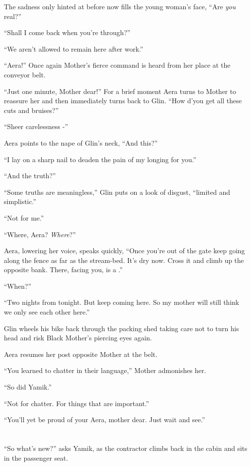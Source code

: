 \documentclass[twoside,11pt]{book}
\begin{document}
The sadness only hinted at before now fills the young woman's face, ``Are \textit{you}
real?''

``Shall I come back when you're through?''

``We aren't allowed to remain here after work.''

``Aera!'' Once again Mother's fierce command is heard from her place at the conveyor belt.

``Just one minute, Mother dear!'' For a brief moment Aera turns to Mother to
reassure her and then immediately turns back to Glin. ``How d'you get all these cuts and
bruises?''

``Sheer carelessness -''

Aera points to the nape of Glin's neck, ``And this?''

``I lay on a sharp nail to deaden the pain of my longing for you.''

``And the truth?''

``Some truths are meaningless,'' Glin puts on a look of disgust, ``limited and
simplistic.''

``Not for me.''

``Where, Aera? \textit{Where}?''

Aera, lowering her voice, speaks quickly, ``Once you're out of the gate keep going along the fence as far
as the stream-bed. It's dry now. Cross it and climb up the opposite bank. There, facing you, is a .''

``When?''

``Two nights from tonight. But keep coming here. So my mother will still think we only see each other
here.''

Glin wheels his bike back through the packing shed taking care not to turn his head and risk Black Mother's piercing
eyes again.

Aera resumes her post opposite Mother at the belt.

``You learned to chatter in their language,'' Mother admonishes her.

``So did Yamik.''

``Not for chatter. For things that are important.''

``You'll yet be proud of your Aera, mother dear.  Just wait and see.''



\chapter{}

``So what's new?'' asks Yamik, as the contractor climbs back in the cabin and sits in the
passenger seat.
\end{document}
